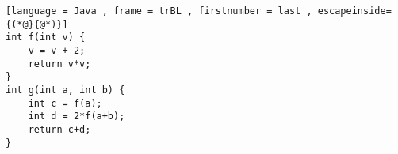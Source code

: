\begin{lstlisting}[language = Java , frame = trBL , firstnumber = last , escapeinside={(*@}{@*)}]
int f(int v) {
    v = v + 2;
    return v*v;
}
int g(int a, int b) {
    int c = f(a);
    int d = 2*f(a+b);
    return c+d;
}
\end{lstlisting}
